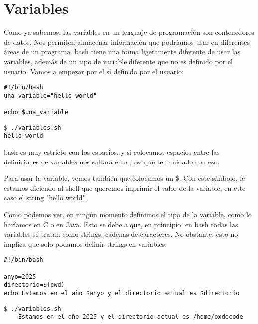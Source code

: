 \section{Variables}

Como ya sabemos, las variables en un lenguaje de programación son contenedores de datos. Nos permiten almacenar información que podríamos usar en diferentes áreas de un programa. bash tiene una forma ligeramente diferente de usar las variables, además de un tipo de variable diferente que no es definido por el usuario. Vamos a empezar por el sí definido por el usuario:

\begin{tcolorbox-code}
\begin{lstlisting}
#!/bin/bash
una_variable="hello world"

echo $una_variable
\end{lstlisting}
\end{tcolorbox-code}

\begin{tcolorbox-code}
\begin{lstlisting}
$ ./variables.sh
hello world
\end{lstlisting}
\end{tcolorbox-code}

bash es muy estricto con los espacios, y si colocamos espacios entre las definiciones de variables nos saltará error, así que ten cuidado con eso.

Para usar la variable, vemos también que colocamos un \$. Con este símbolo, le estamos diciendo al shell que queremos imprimir el valor de la variable, en este caso el string "hello world".

Como podemos ver, en ningún momento definimos el tipo de la variable, como lo haríamos en C o en Java. Esto se debe a que, en principio, en bash todas las variables se tratan como strings, cadenas de caracteres. No obstante, esto no implica que solo podamos definir strings en variables:

\begin{tcolorbox-code}
\begin{lstlisting}
#!/bin/bash

anyo=2025
directorio=$(pwd)
echo Estamos en el año $anyo y el directorio actual es $directorio
\end{lstlisting}
\end{tcolorbox-code}

\begin{tcolorbox-code}
\begin{lstlisting}
$ ./variables.sh
    Estamos en el año 2025 y el directorio actual es /home/oxdecode
\end{lstlisting}
\end{tcolorbox-code}


